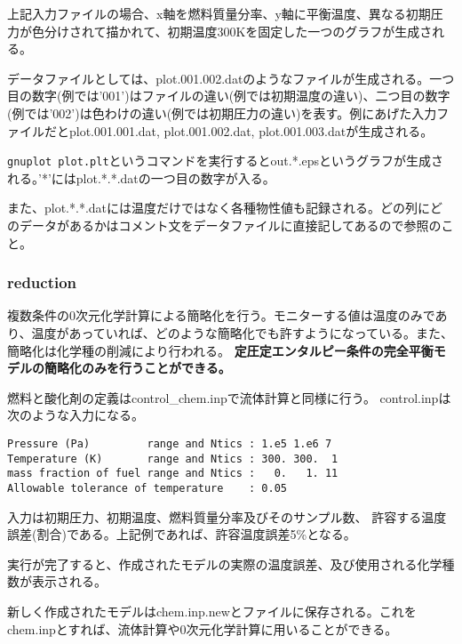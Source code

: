 \documentclass{jsarticle}
\begin{document}
上記入力ファイルの場合、x軸を燃料質量分率、y軸に平衡温度、異なる初期圧力が色分けされて描かれて、初期温度300Kを固定した一つのグラフが生成される。

データファイルとしては、plot.001.002.datのようなファイルが生成される。一つ目の数字(例では'001')はファイルの違い(例では初期温度の違い)、二つ目の数字(例では'002')は色わけの違い(例では初期圧力の違い)を表す。例にあげた入力ファイルだとplot.001.001.dat, plot.001.002.dat, plot.001.003.datが生成される。

\verb|gnuplot plot.plt|というコマンドを実行するとout.*.epsというグラフが生成される。'*'にはplot.*.*.datの一つ目の数字が入る。

また、plot.*.*.datには温度だけではなく各種物性値も記録される。どの列にどのデータがあるかはコメント文をデータファイルに直接記してあるので参照のこと。
\subsubsection{reduction}%
複数条件の0次元化学計算による簡略化を行う。モニターする値は温度のみであり、温度があっていれば、どのような簡略化でも許すようになっている。また、簡略化は化学種の削減により行われる。
\textbf{定圧定エンタルピー条件の完全平衡モデルの簡略化のみを行うことができる。}

燃料と酸化剤の定義はcontrol\_chem.inpで流体計算と同様に行う。
control.inpは次のような入力になる。
\begin{verbatim}
Pressure (Pa)         range and Ntics : 1.e5 1.e6 7
Temperature (K)       range and Ntics : 300. 300.  1
mass fraction of fuel range and Ntics :   0.   1. 11
Allowable tolerance of temperature    : 0.05
\end{verbatim}
入力は初期圧力、初期温度、燃料質量分率及びそのサンプル数、
許容する温度誤差(割合)である。上記例であれば、許容温度誤差5\%となる。

実行が完了すると、作成されたモデルの実際の温度誤差、及び使用される化学種数が表示される。

新しく作成されたモデルはchem.inp.newとファイルに保存される。これをchem.inpとすれば、流体計算や0次元化学計算に用いることができる。
\end{document}
